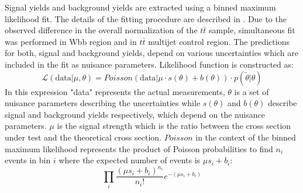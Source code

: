 Signal yields and background yields are extracted using a binned maximum likelihood fit. The details of the fitting procedure are described in \cite{ATL-PHYS-PUB-2011-011}. Due to the observed difference in the overall normalization of the $t\bar{t}$ sample, simultaneous fit was performed in Wbb region and in $t\bar{t}$ multijet control region. 
The predictions for both, signal and background yields, depend on various uncertainties which are included in the fit as nuisance parameters. Likelihood function is constructed as:
\begin{equation}
\mathcal{L}(\mathrm{data}|\mu,\theta) = Poisson(\mathrm{data}|\mu \cdot s(\theta)+b(\theta))\cdot p(\widetilde{\theta} | \theta) 
\end{equation} 
In this expression "data" represents the actual measurements, $\theta$ is a set of nuisance parameters describing the uncertainties while $s(\theta)$ and $b(\theta)$ describe signal and background yields respectively, which depend on the nuisance parameters. $\mu$ is the signal strength which is the ratio between the cross section under test and the theoretical cross section. $Poisson$ in the context of the binned maximum likelihood represents the product of Poisson probabilities to find $n_i$ events in bin $i$ where the expected number of events is $\mu s_i+b_i$:
\begin{equation}
\prod\limits_{i} \frac{(\mu s_i+b_i)^{n_i}}{n_i!}e^{-(\mu s_i+b_i)}
\end{equation}

